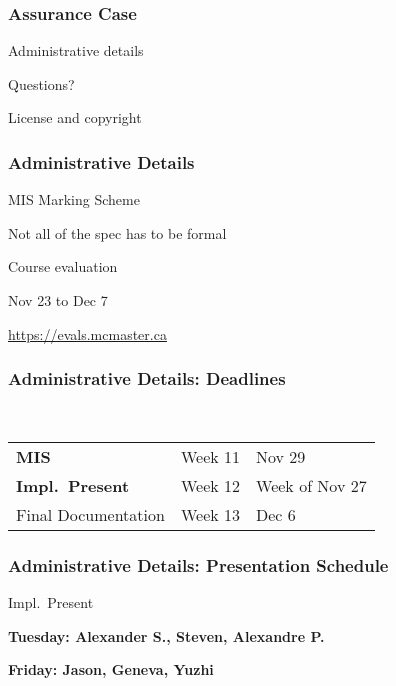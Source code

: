 \documentclass[t,12pt,numbers,fleqn]{beamer}
\begin{document}



\begin{frame}
\frametitle{Assurance Case}

\bi
\item Administrative details
\item Questions?
\item License and copyright
\ei
\end{frame}


\begin{frame}
\frametitle{Administrative Details}

\bi
\item MIS Marking Scheme
\bi
\item Not all of the spec has to be formal
\ei
\item Course evaluation
\bi
\item Nov 23 to Dec 7
\item \url{https://evals.mcmaster.ca}
\ei
\ei

\end{frame}


\begin{frame}
\frametitle{Administrative Details: Deadlines}
~\newline
\begin{tabular}{l l l}
\textbf{MIS} & Week 11 & Nov 29\\
\textbf{Impl.\ Present} & Week 12 & Week of Nov 27\\
Final Documentation & Week 13 & Dec 6\\
\end {tabular}

\end{frame}


\begin{frame}
\frametitle{Administrative Details: Presentation Schedule}

\bi
\item Impl.\ Present
\bi
\item \textbf{Tuesday: Alexander S., Steven, Alexandre P.}
\item \textbf{Friday: Jason, Geneva, Yuzhi}
\ei

\ei

\end{frame}
\end{document}
